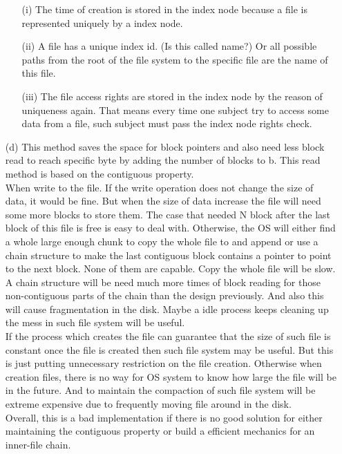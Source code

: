 \documentclass[10pt,twoside,a4paper]{article}
\begin{document}
\begin{itemize}
\begin{itemize}
\item[(i)]
The time of creation is stored in the index node because a file is represented uniquely by a index node.
\item[(ii)]
A file has a unique index id. (Is this called name?) Or all possible paths from the root of the file system to the specific file are the name of this file.
\item[(iii)]
The file access rights are stored in the index node by the reason of uniqueness again. That means every time one subject try to access some data from a file, such subject must pass the index node rights check.
\end{itemize}
\item[(d)]
This method saves the space for block pointers and also need less block read to reach specific byte by adding the number of blocks to b. This read method is based on the contiguous property.
\\When write to the file. If the write operation does not change the size of data, it would be fine. But when the size of data increase the file will need some more blocks to store them. The case that needed N block after the last block of this file is free is easy to deal with. Otherwise, the OS will either find a whole large enough chunk to copy the whole file to and append or use a chain structure to make the last contiguous block contains a pointer to point to the next block. None of them are capable. Copy the whole file will be slow. A chain structure will be need much more times of block reading for those non-contiguous parts of the chain than the design previously. And also this will cause fragmentation in the disk. Maybe a idle process keeps cleaning up the mess in such file system will be useful.
\\If the process which creates the file can guarantee that the size of such file is constant once the file is created then such file system may be useful. But this is just putting unnecessary restriction on the file creation. Otherwise when creation files, there is no way for OS system to know how large the file will be in the future. And to maintain the compaction of such file system will be extreme expensive due to frequently moving file around in the disk.
\\Overall, this is a bad implementation if there is no good solution for either maintaining the contiguous property or build a efficient mechanics for an inner-file chain.
\end{itemize}
\end{document}
